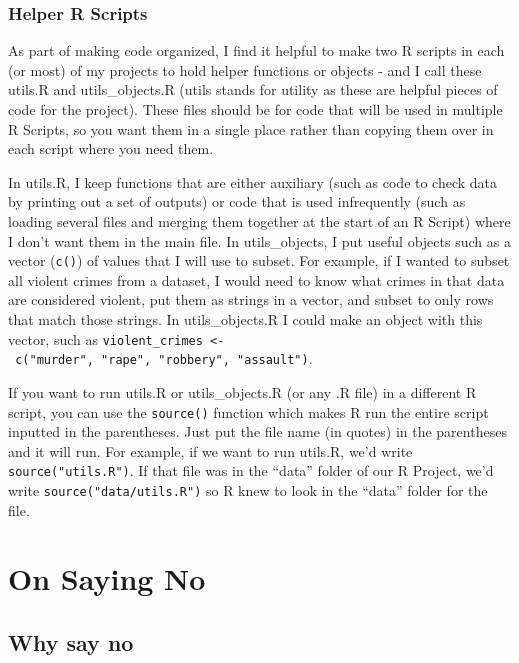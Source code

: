 \documentclass[
  12pt,
  openany]{book}
\begin{document}
\hypertarget{helper-r-scripts}{%
\subsection{Helper R Scripts}\label{helper-r-scripts}}

As part of making code organized, I find it helpful to make two R scripts in each (or most) of my projects to hold helper functions or objects - and I call these utils.R and utils\_objects.R (utils stands for utility as these are helpful pieces of code for the project). These files should be for code that will be used in multiple R Scripts, so you want them in a single place rather than copying them over in each script where you need them.

In utils.R, I keep functions that are either auxiliary (such as code to check data by printing out a set of outputs) or code that is used infrequently (such as loading several files and merging them together at the start of an R Script) where I don't want them in the main file. In utils\_objects, I put useful objects such as a vector (\texttt{c()}) of values that I will use to subset. For example, if I wanted to subset all violent crimes from a dataset, I would need to know what crimes in that data are considered violent, put them as strings in a vector, and subset to only rows that match those strings. In utils\_objects.R I could make an object with this vector, such as \texttt{violent\_crimes\ \textless{}-\ c("murder",\ "rape",\ "robbery",\ "assault")}.

If you want to run utils.R or utils\_objects.R (or any .R file) in a different R script, you can use the \texttt{source()} function which makes R run the entire script inputted in the parentheses. Just put the file name (in quotes) in the parentheses and it will run. For example, if we want to run utils.R, we'd write \texttt{source("utils.R")}. If that file was in the ``data'' folder of our R Project, we'd write \texttt{source("data/utils.R")} so R knew to look in the ``data'' folder for the file.

\hypertarget{on-saying-no}{%
\chapter{On Saying No}\label{on-saying-no}}

\hypertarget{why-say-no}{%
\section{Why say no}\label{why-say-no}}
\end{document}
